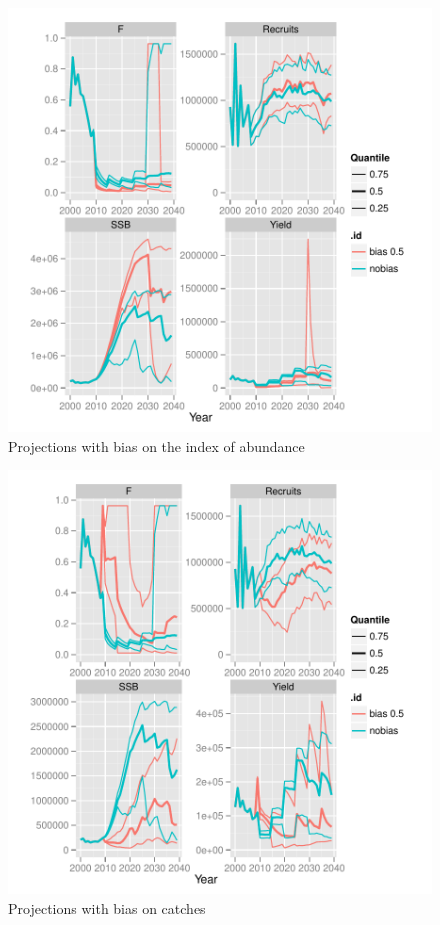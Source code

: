 \documentclass[a4paper]{article}
\begin{document}
\begin{figure}[H]
\centering
\includegraphics{MSE-005}
\caption{Projections with bias on the index of abundance}
\label{fig:srvBias}
\end{figure}

\begin{figure}[H]
\centering
\includegraphics{MSE-006}
\caption{Projections with bias on catches}
\label{fig:cthBias}
\end{figure}
\end{document}
